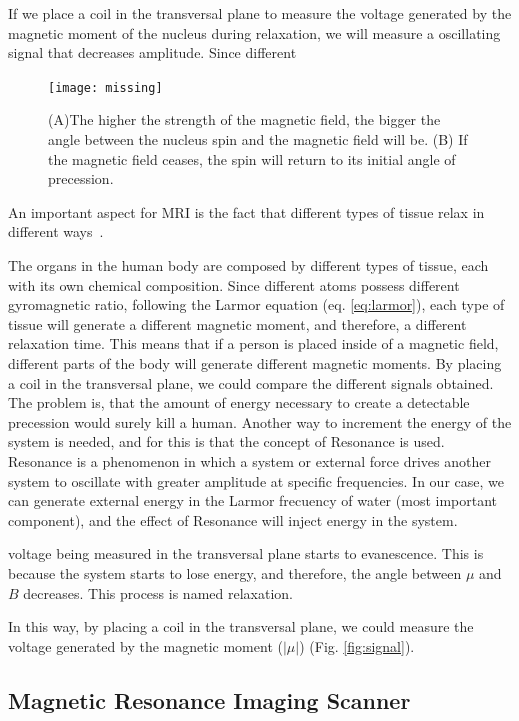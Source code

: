 If we place a coil in the transversal plane to measure the voltage generated
by the magnetic moment of the nucleus during relaxation, we will measure
a oscillating signal that decreases amplitude. Since different 

\begin{figure}[h]
    \texttt{[image: missing]}
    \caption{(A)The higher the strength of the magnetic field, the bigger the angle
             between the nucleus spin and the magnetic field will be. (B) If the
             magnetic field ceases, the spin will return to its initial angle of precession.}
    \label{fig:spin}
\end{figure} 

An important aspect for MRI is the fact that different types of tissue relax in
different ways~\cite{Reichson1971}. 

The organs in the human body are composed by different types of tissue, each
with its own chemical composition. Since different atoms possess different
gyromagnetic ratio, following the Larmor equation (eq. \ref{eq:larmor}), each
type of tissue will generate a different magnetic moment, and therefore,
a different relaxation time.
This means that if a person is placed inside of a magnetic field, different parts of the body will generate different magnetic moments.
By placing a coil in the transversal plane, we could compare the different signals obtained.
The problem is, that the amount of energy necessary to create a detectable precession would surely kill a human.
Another way to increment the energy of the system is needed, and for this is that the concept of Resonance is used.
Resonance is a phenomenon in which a system or external force drives another system to oscillate with greater amplitude at specific frequencies.
In our case, we can generate external energy in the Larmor frecuency of water (most important component), and the effect of Resonance will inject energy in the system.

voltage being measured in the transversal plane starts to evanescence.
This is because the system starts to lose energy, and therefore, the angle between $\mu$ and $B$ decreases.
This process is named relaxation.

 In this way, by placing
a coil in the transversal plane, we could measure the voltage generated by the
magnetic moment ($|\mu|$) (Fig. \ref{fig:signal}).



\subsection{Magnetic Resonance Imaging Scanner}

